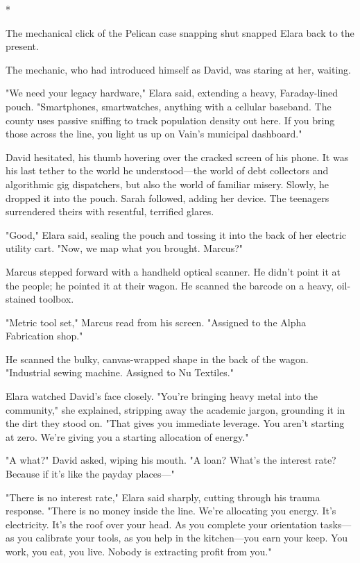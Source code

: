 \textit{}*

The mechanical click of the Pelican case snapping shut snapped Elara back to the present. 

The mechanic, who had introduced himself as David, was staring at her, waiting. 

"We need your legacy hardware," Elara said, extending a heavy, Faraday-lined pouch. "Smartphones, smartwatches, anything with a cellular baseband. The county uses passive sniffing to track population density out here. If you bring those across the line, you light us up on Vain's municipal dashboard."

David hesitated, his thumb hovering over the cracked screen of his phone. It was his last tether to the world he understood—the world of debt collectors and algorithmic gig dispatchers, but also the world of familiar misery. Slowly, he dropped it into the pouch. Sarah followed, adding her device. The teenagers surrendered theirs with resentful, terrified glares.

"Good," Elara said, sealing the pouch and tossing it into the back of her electric utility cart. "Now, we map what you brought. Marcus?"

Marcus stepped forward with a handheld optical scanner. He didn't point it at the people; he pointed it at their wagon. He scanned the barcode on a heavy, oil-stained toolbox. 

"Metric tool set," Marcus read from his screen. "Assigned to the Alpha Fabrication shop."

He scanned the bulky, canvas-wrapped shape in the back of the wagon. "Industrial sewing machine. Assigned to Nu Textiles."

Elara watched David's face closely. "You're bringing heavy metal into the community," she explained, stripping away the academic jargon, grounding it in the dirt they stood on. "That gives you immediate leverage. You aren't starting at zero. We're giving you a starting allocation of energy."

"A what?" David asked, wiping his mouth. "A loan? What's the interest rate? Because if it's like the payday places—"

"There is no interest rate," Elara said sharply, cutting through his trauma response. "There is no money inside the line. We're allocating you energy. It's electricity. It's the roof over your head. As you complete your orientation tasks—as you calibrate your tools, as you help in the kitchen—you earn your keep. You work, you eat, you live. Nobody is extracting profit from you."

